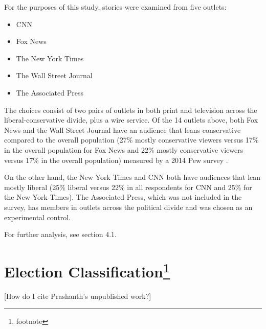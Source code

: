 For the purposes of this study, stories were examined from five outlets: 

\begin{itemize}
\itemsep-1em 
  \item CNN
  \item Fox News  
  \item The New York Times
  \item The Wall Street Journal 
  \item The Associated Press 
\end{itemize}

The choices consist of two pairs of outlets in both print and television across the liberal-conservative divide, plus a wire service. Of the 14 outlets above, both Fox News and the Wall Street Journal have an audience that leans conservative compared to the overall population (27\% mostly conservative viewers versus 17\% in the overall population for Fox News and 22\% mostly conservative viewers versus 17\% in the overall population) measured by a 2014 Pew survey \cite{PoliticalPolarization}.

On the other hand, the New York Times and CNN both have audiences that lean mostly liberal (25\% liberal versus 22\% in all respondents for CNN and 25\% for the New York Times). The Associated Press, which was not included in the survey, has members in outlets across the political divide and was chosen as an experimental control.
 
For further analysis, see section 4.1.

\section[Election Classification] {Election Classification\footnote{footnote}}

[How do I cite Prashanth's unpublished work?]
 

